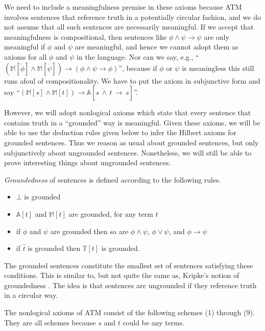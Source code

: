 \documentclass{amsart}
\theoremstyle{definition}
\begin{document}
We need to include a meaningfulness premise in these axioms because ATM involves sentences that reference truth in a potentially circular fashion, and we do not assume that all such sentences are necessarily meaningful. If we accept that meaningfulness is compositional, then sentences like $\phi \wedge \psi \to \psi$ are only meaningful if $\phi$ and $\psi$ are meaningful, and hence we cannot adopt them as axioms for all $\phi$ and $\psi$ in the language. Nor can we say, e.g., ``$(\mathbb{M}[\dot{\phi}] \wedge \mathbb{M}[\dot{\psi}]) \to (\phi \wedge \psi \to \phi)$'', because if $\phi$ or $\psi$ is meaningless this still runs afoul of compositionality. We have to put the axiom in subjunctive form and say ``$(\mathbb{M}[s] \wedge \mathbb{M}[t]) \to \mathbb{A}[s\, \dot{\wedge}\, t\,\dot{\to}\, s]$''.

However, we will adopt nonlogical axioms which state that every sentence that contains truth in a ``grounded'' way is meaningful. Given these axioms, we will be able to use the deduction rules given below to infer the Hilbert axioms for grounded sentences. Thus we reason as usual about grounded sentences, but only subjunctively about ungrounded sentences. Nonetheless, we will still be able to prove interesting things about ungrounded sentences.

{\it Groundedness} of sentences is defined according to the following rules.

\begin{itemize}
\item $\bot$ is grounded

\item $\mathbb{A}[t]$ and $\mathbb{M}[t]$ are grounded, for any term $t$

\item if $\phi$ and $\psi$ are grounded then so are $\phi \wedge \psi$, $\phi \vee \psi$, and $\phi \to \psi$

\item if $\hat{t}$ is grounded then $\mathbb{T}[t]$ is grounded.
\end{itemize}
The grounded sentences constitute the smallest set of sentences satisfying these conditions. This is similar to, but not quite the same as, Kripke's notion of groundedness \cite{kripke}. The idea is that sentences are ungrounded if they reference truth in a circular way.

The nonlogical axioms of ATM consist of the following schemes (1) through (9). They are all schemes because $s$ and $t$ could be any terms.
\end{document}
